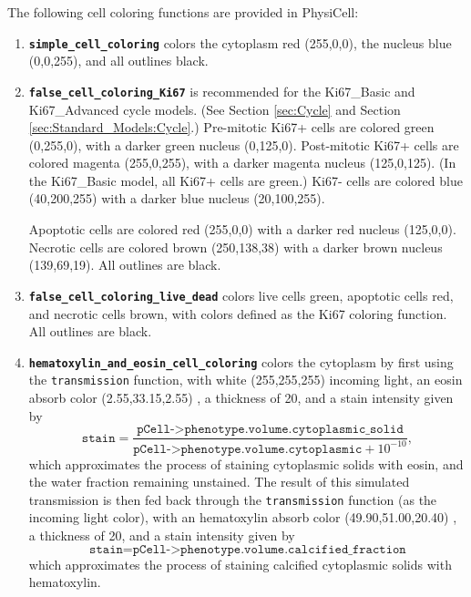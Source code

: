 \documentclass[12pt]{article}
\newcommand{\beq}{\begin{equation}}
\newcommand{\eeq}{\end{equation}}
\renewcommand{\v}{\verb}
\newcommand{\smallcode}[1]{\textbf{\texttt{#1}}}
\begin{document}
The following cell coloring functions are provided in PhysiCell: 

\begin{enumerate}
\item
\smallcode{simple\_cell\_coloring} colors the cytoplasm red (255,0,0),
the nucleus blue (0,0,255), and all outlines black. 

\item 
\smallcode{false\_cell\_coloring\_Ki67} is recommended for the 
Ki67\_Basic and Ki67\_Advanced cycle models. (See Section \ref{sec:Cycle} and 
Section \ref{sec:Standard_Models:Cycle}.) Pre-mitotic Ki67+ cells 
are colored green (0,255,0), with a darker green nucleus (0,125,0). 
Post-mitotic Ki67+ cells 
are colored magenta (255,0,255), with a darker magenta nucleus (125,0,125). 
(In the Ki67\_Basic model, all Ki67+ cells are green.) Ki67- cells 
are colored blue (40,200,255) with a darker blue nucleus (20,100,255). 

Apoptotic cells are colored red (255,0,0) with a darker red nucleus (125,0,0). 
Necrotic cells are colored brown (250,138,38) with a darker brown nucleus 
(139,69,19). All outlines are black. 

\item 
\smallcode{false\_cell\_coloring\_live\_dead} colors live cells green, 
apoptotic cells red, and necrotic cells brown, with colors defined as the 
Ki67 coloring function. All outlines are black. 

\item
\smallcode{hematoxylin\_and\_eosin\_cell\_coloring} colors 
the cytoplasm by first using the \v|transmission| function, with white (255,255,255) 
incoming light, an eosin absorb color 
(2.55,33.15,2.55) \cite{ref:H_and_E}, 
a thickness of 20, and a stain intensity given by 
%
\beq
\texttt{stain} = 
 \frac{ \texttt{pCell->phenotype.volume.cytoplasmic\_solid} }
 { \texttt{pCell->phenotype.volume.cytoplasmic} + 10^{-10} }, 
\eeq
%
which approximates the process of staining cytoplasmic solids with eosin, and 
the water fraction remaining unstained. The result of this simulated transmission 
is then fed back through the \v|transmission| function (as the incoming light color), 
with an hematoxylin absorb color 
(49.90,51.00,20.40) \cite{ref:H_and_E}, 
a thickness of 20, and a stain intensity given by 
%
\beq
\texttt{stain} = 
\texttt{pCell->phenotype.volume.calcified\_fraction}
\eeq
%
which approximates the process of staining calcified cytoplasmic solids with 
hematoxylin. 


\end{enumerate}
\end{document}
